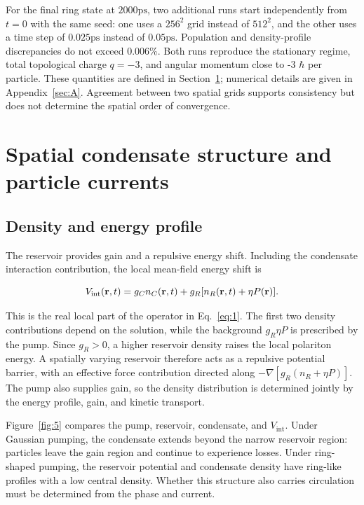 \documentclass[12pt,a4paper]{article}
\begin{document}
For the final ring state at $2000 \mathrm{ps}$, two additional runs start independently from $t=0$ with the same seed: one uses a $256^2$ grid instead of $512^2$, and the other uses a time step of $0.025 \mathrm{ps}$ instead of $0.05 \mathrm{ps}$. Population and density-profile discrepancies do not exceed 0.006\%. Both runs reproduce the stationary regime, total topological charge $q=-3$, and angular momentum close to -3 $\hbar$ per particle. These quantities are defined in Section~\ref{sec:6}; numerical details are given in Appendix~\ref{sec:A}. Agreement between two spatial grids supports consistency but does not determine the spatial order of convergence.

\clearpage

\section{Spatial condensate structure and particle currents}\label{sec:6}

\subsection{Density and energy profile}\label{sec:6.1}

The reservoir provides gain and a repulsive energy shift. Including the condensate interaction contribution, the local mean-field energy shift is

\begin{equation}\label{eq:28}
V_{\rm int}(\mathbf r,t)=g_Cn_C(\mathbf r,t)+g_R[n_R(\mathbf r,t)+\eta P(\mathbf r)].\end{equation}

This is the real local part of the operator in Eq.~\eqref{eq:1}. The first two density contributions depend on the solution, while the background $g_{R} \eta P$ is prescribed by the pump. Since $g_{R}>0$, a higher reservoir density raises the local polariton energy. A spatially varying reservoir therefore acts as a repulsive potential barrier, with an effective force contribution directed along $-\nabla[g_{R}(n_{R}+\eta P)]$. The pump also supplies gain, so the density distribution is determined jointly by the energy profile, gain, and kinetic transport.

Figure~\ref{fig:5} compares the pump, reservoir, condensate, and $V_{\mathrm{int}}$. Under Gaussian pumping, the condensate extends beyond the narrow reservoir region: particles leave the gain region and continue to experience losses. Under ring-shaped pumping, the reservoir potential and condensate density have ring-like profiles with a low central density. Whether this structure also carries circulation must be determined from the phase and current.
\end{document}
